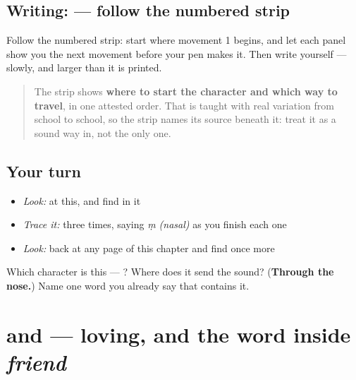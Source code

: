 \subsection*{Writing:  — follow the numbered strip}

Follow the numbered strip: start where movement 1 begins, and let each panel show you the next movement before your pen makes it. Then write  yourself — slowly, and larger than it is printed.

\begin{quote}
The strip shows \textbf{where to start the character and which way to travel}, in one attested order. That is taught with real variation from school to school, so the strip names its source beneath it: treat it as a sound way in, not the only one.
\end{quote}

\subsection*{Your turn}
\begin{itemize}
\raggedright
  \item \emph{Look:} at this, and find  in it
\end{itemize}

\begin{quote}
\end{quote}

\begin{itemize}
\raggedright
  \item \emph{Trace it:}  three times, saying \emph{ṃ (nasal)} as you finish each one
  \item \emph{Look:} back at any page of this chapter and find  once more
\end{itemize}

\begin{tcolorbox}[breakable,colback=teal!4,colframe=teal!35!black,title={Before you move on}]
Which character is this — ? Where does it send the sound? (\textbf{Through the nose.}) Name one word you already say that contains it.
\end{tcolorbox}
\section[\texorpdfstring{\sk{स्निह्यति} · \sk{प्रियम्} (snihyati · priyam)}{स्निह्यति · प्रियम् (snihyati · priyam)}]{ and  — loving, and the word inside \emph{friend}}

